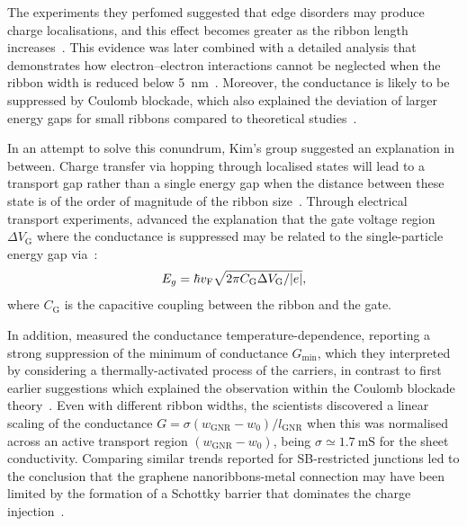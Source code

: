 The experiments they perfomed suggested that edge disorders may produce charge localisations, and this effect becomes greater as the ribbon length increases~\cite{areshkin2007ballistic, martin2009transport, chen2007graphene}. This evidence was later combined with a detailed analysis that demonstrates how electron--electron interactions cannot be neglected when the ribbon width is reduced below \SI{5}{\nano\metre}~\cite{ponomarenko2008chaotic}. Moreover, the conductance is likely to be suppressed by Coulomb blockade, which also explained the deviation of larger energy gaps for small ribbons compared to theoretical studies~\cite{martin2009transport, ponomarenko2008chaotic}.

In an attempt to solve this conundrum, Kim's group suggested an explanation in between. Charge transfer via hopping through localised states will lead to a transport gap rather than a single energy gap when the distance between these state is of the order of magnitude of the ribbon size~\cite{han2010electron}. Through electrical transport experiments, \citeauthor{han2010electron} advanced the explanation that the gate voltage region $\Delta V_\text{G}$ where the conductance is suppressed may be related to the single-particle energy gap via~\cite{castroneto2009}:
%
\begin{equation}
    E_g = \hbar v_\textrm{F}\sqrt{2\pi C_\textrm{G} \Delta V_\text{G}/\abs{e}},
\end{equation}
%
where $C_\textrm{G}$ is the capacitive coupling between the ribbon and the gate.

In addition,  measured the conductance temperature-dependence, reporting a strong suppression of the minimum of conductance $G_\textrm{min}$, which they interpreted by considering a thermally-activated process of the carriers, in contrast to first earlier suggestions which explained the observation within the Coulomb blockade theory~\cite{beenakker1991theory}. Even with different ribbon widths, the scientists discovered a linear scaling of the conductance $G = \sigma(w_\textrm{GNR} - w_0)/l_\textrm{GNR}$ when this was normalised across an active transport region $(w_\textrm{GNR} - w_0)$, being $\sigma\simeq \SI{1.7}{\milli\siemens}$ for the sheet conductivity. Comparing similar trends reported for \gls{SB}-restricted junctions led to the conclusion that the graphene nanoribbons-metal connection may have been limited by the formation of a Schottky barrier that dominates the charge injection~\cite{DiBartolomeo2016}.

